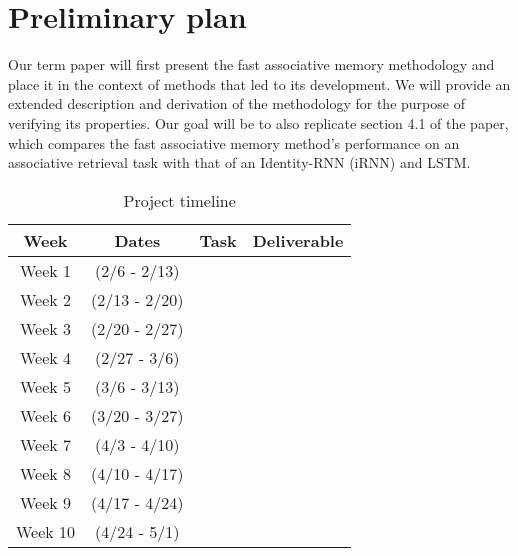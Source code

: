 \section{Preliminary plan}

Our term paper will first present the fast associative memory methodology and place it in the context of methods that led to its development. We will provide an extended description and derivation of the methodology for the purpose of verifying its properties. Our goal will be to also replicate section 4.1 of the paper, which compares the fast associative memory method's performance on an associative retrieval task with that of an Identity-RNN (iRNN) and LSTM.


\begin{table}
  \caption{Project timeline}
  \label{tab:freq}
  \begin{tabular}{cccl}
    \toprule
    Week & Dates & Task & Deliverable\\
    \midrule
    Week 1 & (2/6   - 2/13) & & \\
    Week 2 & (2/13  - 2/20) & & \\
    Week 3 & (2/20  - 2/27) & & \\
    Week 4 & (2/27  - 3/6) & & \\
    Week 5 & (3/6   - 3/13) & & \\
    Week 6 & (3/20  - 3/27) & & \\
    Week 7 & (4/3   - 4/10) & & \\
    Week 8 & (4/10  - 4/17) & & \\
    Week 9 & (4/17  - 4/24) & & \\
    Week 10 & (4/24 - 5/1) & & \\
  \bottomrule
\end{tabular}
\end{table}

